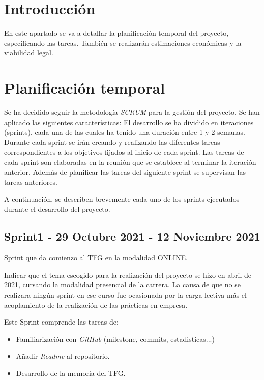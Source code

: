 
\section{Introducción}
En este apartado se va a detallar la planificación temporal del proyecto,
especificando las tareas. También se realizarán estimaciones económicas y la
viabilidad legal.
\section{Planificación temporal}

Se ha decidido seguir la metodología \textit{SCRUM} para la gestión del proyecto.
Se han aplicado las siguientes características:
El desarrollo se ha dividido en iteraciones (sprints), cada una de las cuales ha tenido una duración entre 1 y 2 semanas. Durante cada sprint se irán creando y realizando las diferentes tareas correspondientes a
los objetivos fijados al inicio de cada sprint. Las tareas de cada sprint son elaboradas en la reunión que se establece al terminar la iteración anterior. Además de planificar las tareas del siguiente sprint se supervisan las tareas anteriores.

A continuación, se describen brevemente cada uno de los sprints ejecutados durante el desarrollo del proyecto.

\subsection{Sprint1 - 29 Octubre 2021 - 12 Noviembre 2021}

Sprint que da comienzo al TFG en la modalidad ONLINE. 

Indicar que el tema escogido para la realización del proyecto se hizo en abril de 2021, cursando la modalidad presencial de la carrera. La causa de que no se realizara ningún sprint en ese curso fue ocasionada por la carga lectiva más el acoplamiento de la realización de las prácticas en empresa.

Este Sprint comprende las tareas de:
\begin{itemize}
\item Familiarización con \textit{GitHub} (milestone, commits, estadisticas...)
\item Añadir \textit{Readme} al repositorio.
\item Desarrollo de la memoria del TFG.
\end{itemize}


